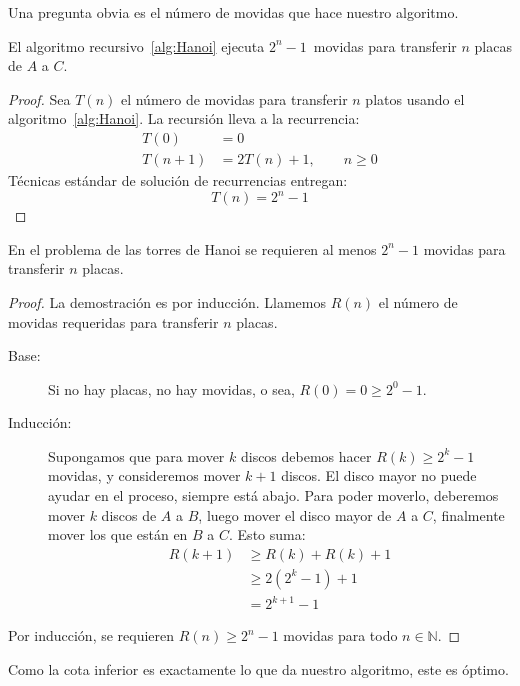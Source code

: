   Una pregunta obvia es el número de movidas que hace nuestro algoritmo.
  \begin{proposition}
    \label{pro:Hanoi-recursive}
    El algoritmo recursivo~\ref{alg:Hanoi}
    ejecuta \(2^n - 1\)~movidas para transferir \(n\) placas de \(A\) a \(C\).
  \end{proposition}
  \begin{proof}
    Sea \(T(n)\) el número de movidas para transferir \(n\) platos
    usando el algoritmo~\ref{alg:Hanoi}.
    La recursión lleva a la recurrencia:
    \begin{align*}
      T(0)
        &= 0 \\
      T(n + 1)
        &= 2 T(n) + 1,\qquad n \ge 0
    \end{align*}
    Técnicas estándar de solución de recurrencias entregan:
    \begin{equation*}
      T(n)
        = 2^n - 1
    \end{equation*}
    \qedhere
  \end{proof}
  \begin{proposition}
    \label{pro:Hanoi-optimal}
    En el problema de las torres de Hanoi
    se requieren al menos \(2^n - 1\) movidas para transferir \(n\) placas.
  \end{proposition}
  \begin{proof}
    La demostración es por inducción.
    Llamemos \(R(n)\) el número de movidas requeridas
    para transferir \(n\) placas.
    \begin{description}
    \item[Base:]
      Si no hay placas,
      no hay movidas,
      o sea,
      \(R(0) = 0 \ge 2^0 - 1\).
    \item[Inducción:]
      Supongamos que para mover \(k\)
      discos debemos hacer \(R(k) \ge 2^k - 1\) movidas,
      y consideremos mover \(k + 1\) discos.
      El disco mayor no puede ayudar en el proceso,
      siempre está abajo.
      Para poder moverlo,
      deberemos mover \(k\) discos de \(A\) a \(B\),
      luego mover el disco mayor de \(A\) a \(C\),
      finalmente mover los que están en \(B\) a \(C\).
      Esto suma:
      \begin{align*}
        R(k + 1)
          &\ge R(k) + R(k) + 1 \\
          &\ge 2 (2^k - 1) + 1 \\
          &=   2^{k + 1} - 1
      \end{align*}
    \end{description}
    Por inducción,
    se requieren \(R(n) \ge 2^n - 1\) movidas para todo \(n \in \mathbb{N}\).
  \end{proof}
  Como la cota inferior es exactamente lo que da nuestro algoritmo,
  este es óptimo.

